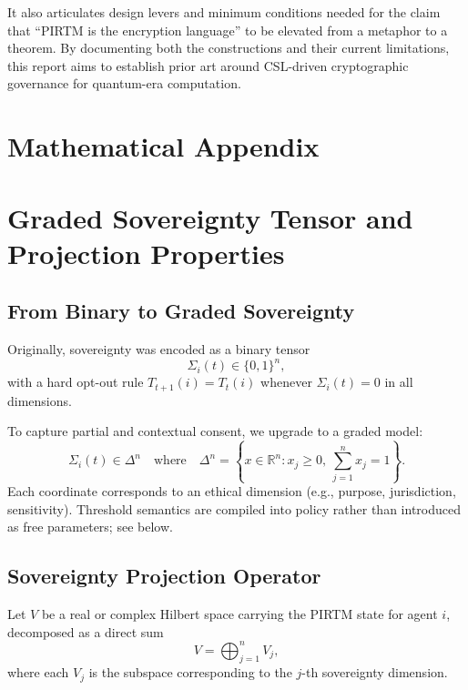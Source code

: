 \documentclass[11pt]{article}
\begin{document}
It also articulates design levers and minimum conditions needed for the claim that ``PIRTM is the encryption language'' to be elevated from a metaphor to a theorem.
By documenting both the constructions and their current limitations, this report aims to establish prior art around CSL-driven cryptographic governance for quantum-era computation.

\appendix
\section*{Mathematical Appendix}

\section{Graded Sovereignty Tensor and Projection Properties}

\subsection{From Binary to Graded Sovereignty}

Originally, sovereignty was encoded as a binary tensor
\[
  \Sigma_i(t) \in \{0,1\}^n,
\]
with a hard opt-out rule
\(
  T_{t+1}(i) = T_t(i)
\)
whenever $\Sigma_i(t) = 0$ in all dimensions.

To capture partial and contextual consent, we upgrade to a graded model:
\begin{equation}
  \Sigma_i(t) \in \Delta^n
  \quad\text{where}\quad
  \Delta^n
    = \left\{ x \in \mathbb{R}^n : x_j \ge 0,\ \sum_{j=1}^n x_j = 1 \right\}.
  \label{eq:graded-sigma-appendix}
\end{equation}
Each coordinate corresponds to an ethical dimension (e.g., purpose, jurisdiction, sensitivity).
Threshold semantics are compiled into policy rather than introduced as free parameters; see below.

\subsection{Sovereignty Projection Operator}

Let $V$ be a real or complex Hilbert space carrying the PIRTM state for agent $i$, decomposed as a direct sum
\begin{equation}
  V = \bigoplus_{j=1}^n V_j,
  \label{eq:space-decomp}
\end{equation}
where each $V_j$ is the subspace corresponding to the $j$-th sovereignty dimension.
\end{document}
